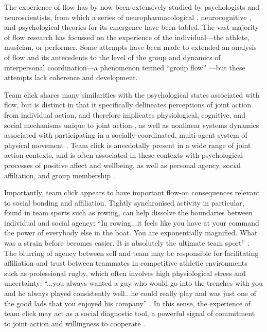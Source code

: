 \begin{CJK}{UTF8}{gbsn}
The experience of flow has by now been extensively studied by psychologists and neuroscientists, from which a series of neuropharmacological \citep{Boecker2008}, neurocognitive \citep{Dietrich2006,Dietrich2011,Labelle2013}, and psychological \citep{Csikszentmihalyi1992} theories for its emergence have been tabled.  The vast majority of flow research has focussed on the experience of the individual---the athlete, musician, or performer.  Some attempts have been made to extended an analysis of flow and its antecedents to the level of the group and dynamics of interpersonal coordination---a phenomenon termed ``group flow'' \citep{Sawyer2006}---but these attempts lack coherence and development.

Team click shares many similarities with the psychological states associated with flow, but is distinct in that it specifically delineates perceptions of joint action from individual action, and therefore implicates physiological, cognitive, and social mechanisms unique to joint action \citep{Vesper2010}, as well as nonlinear systems dynamics associated with participating in a socially-coordinated, multi-agent system of physical movement \citep{Kelso2009}.  Team click is anecdotally present in a wide range of joint action contexts, and is often associated in these contexts with psychological processes of positive affect and wellbeing, as well as personal agency, social affiliation, and group membership \citep{Jackson1995,Marsh2009,Wheatley2012,Slingerland2014}.

Importantly, team click appears to have important flow-on consequences relevant to social bonding and affiliation. Tightly synchronised activity in particular, found in team sports such as rowing, can help dissolve the boundaries between individual and social agency: ``In rowing...it feels like you have at your command the power of everybody else in the boat. You are exponentially magnified. What was a strain before becomes easier. It is absolutely the ultimate team sport'' \citep{Brown2016}.
The blurring of agency between self and team may be responsible for facilitating affiliation and trust between teammates in competitive athletic environments such as professional rugby, which often involves high physiological stress and uncertainty: ``...you always wanted a guy who would go into the trenches with you and he always played consistently well...he could really play and was just one of the good lads that you enjoyed his company'' \citep{Fox-Sports2017}. In this sense, the experience of team click may act as a social diagnostic tool, a powerful signal of commitment to joint action and willingness to cooperate \citep{Reddish2013a}. \\
\\
\\


\end{CJK}
